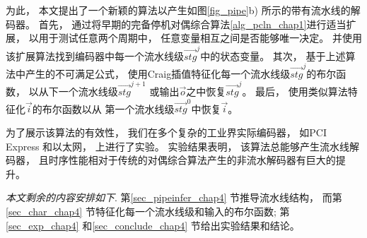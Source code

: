 为此，
本文提出了一个新颖的算法以产生如图\ref{fig_pipe}b) 所示的带有流水线的解码器。
首先，
通过将早期的完备停机对偶综合算法\ref{alg_pcln_chap1}进行适当扩展，
以用于测试任意两个周期中，
任意变量相互之间是否能够唯一决定。
并使用该扩展算法找到编码器中每一个流水线级$\vec{stg}^j$中的状态变量。
其次，
基于上述算法中产生的不可满足公式，
使用Craig插值特征化每一个流水线级$\vec{stg}^j$的布尔函数，
以从下一个流水线级$\vec{stg}^{j+1}$ 或输出$\vec{o}$之中恢复$\vec{stg}^j$。
最后，
使用类似算法特征化$\vec{i}$的布尔函数以从
第一个流水线级$\vec{stg}^0$中恢复$\vec{i}$。


为了展示该算法的有效性，
我们在多个复杂的工业界实际编码器，
如PCI Express  和以太网，
上进行了实验。
实验结果表明，
该算法总能够产生流水线解码器，
且时序性能相对于传统的对偶综合算法产生的非流水解码器有巨大的提升。


\emph{本文剩余的内容安排如下}.
第\ref{sec_pipeinfer_chap4} 节推导流水线结构，
而第\ref{sec_char_chap4} 节特征化每一个流水线级和输入的布尔函数;
第\ref{sec_exp_chap4} 和\ref{sec_conclude_chap4} 节给出实验结果和结论。


